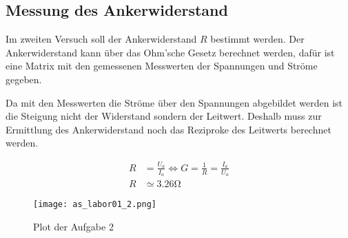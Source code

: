 \subsection{Messung des Ankerwiderstand}

Im zweiten Versuch soll der Ankerwiderstand $R$ bestimmt werden.
Der Ankerwiderstand kann über das Ohm'sche Gesetz berechnet werden,
dafür ist eine Matrix mit den gemessenen Messwerten der Spannungen
und Ströme gegeben.

Da mit den Messwerten die Ströme über den Spannungen abgebildet werden ist die
Steigung nicht der Widerstand sondern der Leitwert. Deshalb muss zur Ermittlung
des Ankerwiderstand noch das Reziproke des Leitwerts berechnet werden.

\begin{equation} \label{eq121}
    \begin{split}
        R&=\frac{U_a}{I_a} \Leftrightarrow G=\frac{1}{R}=\frac{I_a}{U_a}\\
        R&\simeq 3.26 \mathrm{\Omega}
    \end{split}
\end{equation}

\begin{figure}[H]
 \centering
 \texttt{[image: as\_labor01\_2.png]}
 \caption{Plot der Aufgabe 2}
 \label{fig:PlotAufgabe2}
\end{figure}